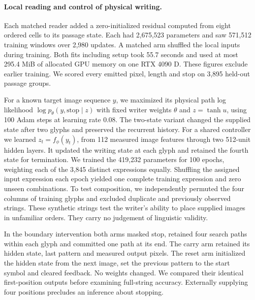 \paragraph{Local reading and control of physical writing.}
Each matched reader added a zero-initialized residual computed from eight ordered cells to its passage state. Each had 2,675,523 parameters and saw 571,512 training windows over 2,980 updates. A matched arm shuffled the local inputs during training. Both fits including setup took 55.7 seconds and used at most 295.4 MiB of allocated GPU memory on one RTX 4090 D. These figures exclude earlier training. We scored every emitted pixel, length and stop on 3,895 held-out passage groups.

For a known target image sequence $y$, we maximized its physical path log likelihood $\log p_\theta(y,\mathrm{stop}\mid z)$ with fixed writer weights $\theta$ and $z=\tanh u$, using 100 Adam steps at learning rate 0.08. The two-state variant changed the supplied state after two glyphs and preserved the recurrent history. For a shared controller we learned $z_t=f_\phi(y_t)$, from 112 measured image features through two 512-unit hidden layers. It updated the writing state at each glyph and retained the fourth state for termination. We trained the 419,232 parameters for 100 epochs, weighting each of the 3,845 distinct expressions equally. Shuffling the assigned input expression each epoch yielded one complete training expression and zero unseen combinations. To test composition, we independently permuted the four columns of training glyphs and excluded duplicate and previously observed strings. These synthetic strings test the writer's ability to place supplied images in unfamiliar orders. They carry no judgement of linguistic validity.

In the boundary intervention both arms masked stop, retained four search paths within each glyph and committed one path at its end. The carry arm retained its hidden state, last pattern and measured output pixels. The reset arm initialized the hidden state from the next image, set the previous pattern to the start symbol and cleared feedback. No weights changed. We compared their identical first-position outputs before examining full-string accuracy. Externally supplying four positions precludes an inference about stopping.
